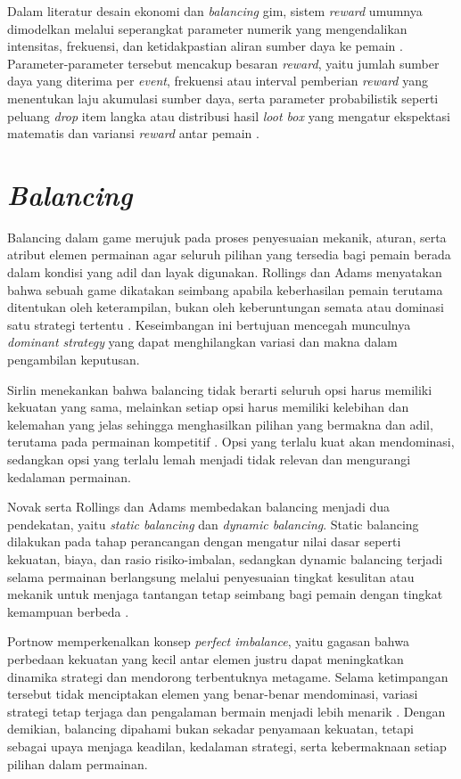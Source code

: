 Dalam literatur desain ekonomi dan \textit{balancing} gim, sistem \textit{reward} umumnya 
dimodelkan melalui seperangkat parameter numerik yang mengendalikan intensitas, 
frekuensi, dan ketidakpastian aliran sumber daya ke pemain \citep{Rupp_2024}. 
Parameter-parameter tersebut mencakup besaran \textit{reward}, 
yaitu jumlah sumber daya yang diterima per \textit{event}, frekuensi atau interval 
pemberian \textit{reward} yang menentukan laju akumulasi sumber daya, serta parameter probabilistik 
seperti peluang \textit{drop} item langka atau distribusi hasil \textit{loot box} yang 
mengatur ekspektasi matematis dan variansi \textit{reward} antar pemain \citep{Clark2023}.

\section{\textit{Balancing}}\label{}
Balancing dalam game merujuk pada proses penyesuaian mekanik, aturan, serta atribut elemen permainan agar seluruh pilihan yang tersedia bagi pemain berada dalam kondisi yang adil dan layak digunakan. Rollings dan Adams menyatakan bahwa sebuah game dikatakan seimbang apabila keberhasilan pemain terutama ditentukan oleh keterampilan, bukan oleh keberuntungan semata atau dominasi satu strategi tertentu \cite{RollingsAdams2003}. Keseimbangan ini bertujuan mencegah munculnya \textit{dominant strategy} yang dapat menghilangkan variasi dan makna dalam pengambilan keputusan.

Sirlin menekankan bahwa balancing tidak berarti seluruh opsi harus memiliki kekuatan yang sama, melainkan setiap opsi harus memiliki kelebihan dan kelemahan yang jelas sehingga menghasilkan pilihan yang bermakna dan adil, terutama pada permainan kompetitif \cite{Sirlin2016}. Opsi yang terlalu kuat akan mendominasi, sedangkan opsi yang terlalu lemah menjadi tidak relevan dan mengurangi kedalaman permainan.

Novak serta Rollings dan Adams membedakan balancing menjadi dua pendekatan, yaitu \textit{static balancing} dan \textit{dynamic balancing}. Static balancing dilakukan pada tahap perancangan dengan mengatur nilai dasar seperti kekuatan, biaya, dan rasio risiko-imbalan, sedangkan dynamic balancing terjadi selama permainan berlangsung melalui penyesuaian tingkat kesulitan atau mekanik untuk menjaga tantangan tetap seimbang bagi pemain dengan tingkat kemampuan berbeda \cite{Novak2012}.

Portnow memperkenalkan konsep \textit{perfect imbalance}, yaitu gagasan bahwa perbedaan kekuatan yang kecil antar elemen justru dapat meningkatkan dinamika strategi dan mendorong terbentuknya metagame. Selama ketimpangan tersebut tidak menciptakan elemen yang benar-benar mendominasi, variasi strategi tetap terjaga dan pengalaman bermain menjadi lebih menarik \cite{Portnow2013}. Dengan demikian, balancing dipahami bukan sekadar penyamaan kekuatan, tetapi sebagai upaya menjaga keadilan, kedalaman strategi, serta kebermaknaan setiap pilihan dalam permainan.


